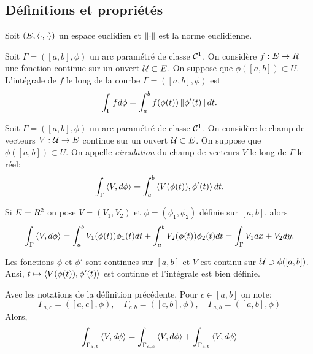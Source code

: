 \subsection{Définitions et propriétés}

Soit $(E,\left\langle \cdot,\cdot\right\rangle)$ un espace euclidien et $\left\lVert \cdot\right\rVert$ est la norme euclidienne. 

\begin{definition}
	 Soit $\Gamma=([a,b],\phi)$ un arc paramétré de classe $\mathcal{C}^1$. On considère $f: E \to R$ une fonction continue sur un ouvert $\mathcal{U}\subset  E$. On suppose que $\phi([a,b]) \subset U$. L'intégrale de $f$ le long de la courbe $\Gamma=([a,b],\phi)$ est
	\[
		\int_{\Gamma} f d\phi =  \int_a^b f(\phi(t)) \left\lVert\phi'(t)\right\rVert dt.
	\]
\end{definition}


\begin{definition}
	Soit $\Gamma=([a,b],\phi)$ un arc paramétré de classe $\mathcal{C}^1$. On considère le champ de vecteurs $V:\mathcal{U}  \to E$ continue sur un ouvert $\mathcal{U}\subset  E$. On suppose que $\phi([a,b]) \subset U$. On appelle \emph{circulation} du champ de vecteurs $V$ le long de $\Gamma$ le réel:
	\[
		\int_{\Gamma} \left\langle V,d\phi\right\rangle = \int_a^b \left\langle V(\phi(t)), \phi'(t)\right\rangle dt.
	\]
\end{definition}

 Si $E=R^2$ on pose $V = (V_1,V_2)$ et $\phi =(\phi_1,\phi_2)$ définie sur $[a,b]$, alors
\[
	\int_{\Gamma} \left\langle V,d\phi\right\rangle = \int_a^b  V_1(\phi(t)) \phi_1(t) dt + \int_a^b V_2(\phi(t)) \phi_2(t) dt = \int_\Gamma V_1 dx + V_2 dy. 
\]

\begin{remark}
	Les fonctions $\phi$ et $\phi'$ sont continues sur $[a,b]$ et $V$ est continu sur $\mathcal{U} \supset \phi([a,b])$. Ansi, $t \mapsto \left\langle V(\phi(t)), \phi'(t)\right\rangle $ est continue et l'intégrale est bien définie.
\end{remark}

\begin{proposition}
	 Avec les notations de la définition précédente. Pour $c\in[a,b]$ on note:
	\[
		\Gamma_{a,c} = ( [a,c] , \phi), \quad
		\Gamma_{c,b} = ( [c,b] , \phi), \quad
		\Gamma_{a,b} = ( [a,b] , \phi)
	\]
	Alors,
	\[
		\int_{\Gamma_{a,b}} \left\langle V,d\phi\right\rangle = \int_{\Gamma_{a,c}} \left\langle V,d\phi\right\rangle + \int_{\Gamma_{c,b}} \left\langle V,d\phi\right\rangle  
	\]
\end{proposition}

